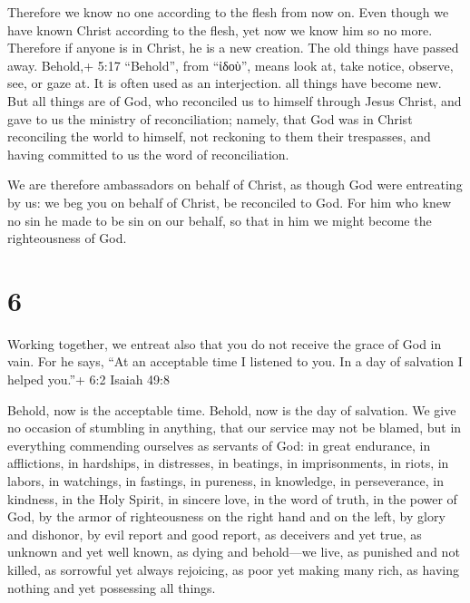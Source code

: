  Therefore we know no one according to the flesh from now
on. Even though we have known Christ according to the flesh, yet now we
know him so no more.  Therefore if anyone is in Christ, he
is a new creation. The old things have passed away. Behold,+ 5:17
``Behold'', from ``ἰδοὺ'', means look at, take notice, observe, see, or
gaze at. It is often used as an interjection. all things have become
new.  But all things are of God, who reconciled us to
himself through Jesus Christ, and gave to us the ministry of
reconciliation;  namely, that God was in Christ reconciling
the world to himself, not reckoning to them their trespasses, and having
committed to us the word of reconciliation.

 We are therefore ambassadors on behalf of Christ, as
though God were entreating by us: we beg you on behalf of Christ, be
reconciled to God.  For him who knew no sin he made to be
sin on our behalf, so that in him we might become the righteousness of
God.

\hypertarget{section-5}{%
\section{6}\label{section-5}}

 Working together, we entreat also that you do not receive
the grace of God in vain.  For he says, ``At an acceptable
time I listened to you. In a day of salvation I helped you.''+ 6:2
Isaiah 49:8

Behold, now is the acceptable time. Behold, now is the day of salvation.
 We give no occasion of stumbling in anything, that our
service may not be blamed,  but in everything commending
ourselves as servants of God: in great endurance, in afflictions, in
hardships, in distresses,  in beatings, in imprisonments, in
riots, in labors, in watchings, in fastings,  in pureness,
in knowledge, in perseverance, in kindness, in the Holy Spirit, in
sincere love,  in the word of truth, in the power of God, by
the armor of righteousness on the right hand and on the left,
 by glory and dishonor, by evil report and good report, as
deceivers and yet true,  as unknown and yet well known, as
dying and behold---we live, as punished and not killed,  as
sorrowful yet always rejoicing, as poor yet making many rich, as having
nothing and yet possessing all things.

